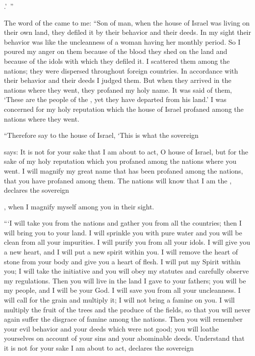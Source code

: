 {{}.’ ”
\par }{\PP {}The word
of the {}
came to me:
“Son
of man,
when the house
of Israel
was living
on
their own land,
they defiled
it by their behavior
and their deeds.
In my sight
their behavior
was like the uncleanness
of a woman having her monthly period.
So I poured
my anger
on
them because
of the blood
they shed
on
the land
and because of the idols
with which they defiled it.
I scattered
them among the nations;
they were dispersed throughout foreign countries.
In accordance with their behavior
and their deeds
I judged them.
But when they arrived
in the nations
where
they went,
they profaned
my holy
name.
It was said
of them, ‘These
are the people
of the {}, yet they have departed
from his land.’
I was concerned
for my holy
reputation
which
the house
of Israel
profaned
among the nations
where
they went.
\par }{\PP {}“Therefore
say
to the house
of Israel,
‘This is what
the sovereign

{}
says: It is not
for your sake
that I am
about to act,
O house
of Israel,
but
for
the sake of my
holy
reputation
which
you profaned
among the nations
where
you went.
I will magnify
my great
name
that has been
profaned
among the nations,
that
you have
profaned
among
them. The nations
will know
that
I am
the {},
declares
the sovereign

{}, when
I magnify
myself among you in their sight.
\par }{\PP {}“‘I will take
you from
the nations
and gather
you from all
the countries;
then I will bring
you to
your land.
I will sprinkle
you with pure
water
and you will be clean
from all
your impurities.
I will purify
you from all
your idols.
I will give
you a new
heart,
and I will put
a new
spirit
within
you. I will
remove
the heart
of stone
from your body
and give
you a heart
of flesh.
I will put
my Spirit
within
you; I will take the initiative
and you will obey
my statutes
and carefully
observe
my regulations.
Then you will live
in the land
I gave
to your fathers;
you will be
my people,
and I
will be
your God.
I will save
you from all
your uncleanness.
I will call
for the grain
and multiply
it; I will
not
bring a famine
on
you.
I will multiply
the
fruit
of the trees
and the produce
of the fields,
so
that you will never
again
suffer
the disgrace
of famine
among the nations.
Then you will remember
your evil
behavior
and your deeds
which
were not
good;
you will loathe
yourselves on
account of your sins
and your abominable deeds.
Understand
that it is not
for your sake
I am
about to act,
declares
the sovereign

}
